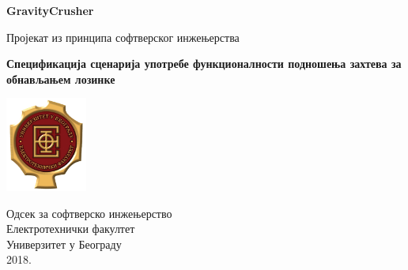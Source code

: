 \begin{titlepage}
	\begin{center}
	
		\vspace*{1cm}
		
		\Huge
		\textbf{GravityCrusher}
		
		\vspace{0.5cm}
		\LARGE
		Пројекат из принципа софтверског инжењерства
		
		\vspace{1.5cm}
		\Large		
		\textbf{Спецификација сценарија употребе функционалности подношења захтева
		за обнављањем лозинке}
		
		\vfill
		
		\includegraphics[width=0.2\textwidth]{../../resources/etflogo}
		
		\large
		Одсек за софтверско инжењерство\\
		Електротехнички факултет\\
		Универзитет у Београду\\
		2018.
	
	\end{center}
\end{titlepage}